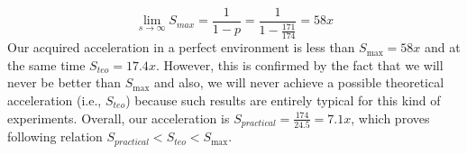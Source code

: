 \begin{equation}
    \label{eqn:amdalh-limit}
    \lim_{s\to\infty} S_{max} = \frac{1}{1-p} = \frac{1}{1-\frac{171}{174}} = 58x
    \tag{8}
\end{equation}
Our acquired acceleration in a perfect environment is less than $S _{\max} = 58x$ and at the same time $S_{teo} = 17.4x$.
However, this is confirmed by the fact that we will never be better than $S_{\max}$ and also, we will never achieve a
possible theoretical acceleration (i.e., $S_{teo}$) because such results are entirely typical for this kind of experiments.
Overall, our acceleration is $S_{practical} = \frac{174}{24.5} = 7.1x$, which proves following relation $S_{practical} < S_{teo} < S_{\max}$.


